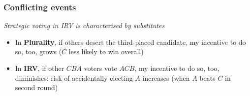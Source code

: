 \documentclass[10pt, en-GB]{beamer}
\begin{document}
\begin{frame}[t]\frametitle{Conflicting events}
    
\emph{Strategic voting in IRV is characterised by substitutes}

\begin{itemize}
	\item In \textbf{Plurality}, if others desert the third-placed candidate, my incentive to do so, too, grows ($C$ less likely to win overall)
	\item In \textbf{IRV}, if other $CBA$ voters vote $ACB$, my incentive to do so, too, diminishes: risk of accidentally electing $A$ increases (when $A$ beats $C$ in second round)

\end{itemize}

\end{frame}
\end{document}

